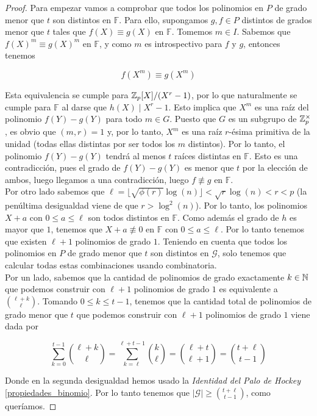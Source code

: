 \begin{proof}
	Para empezar vamos a comprobar que todos los polinomios en $P$ de grado menor que $t$ son distintos en $\mathbb{F}$. Para ello, supongamos $g, f \in P$ distintos de grados menor que $t$ tales que $f(X) \equiv g(X)$ en $\mathbb{F}$. Tomemos $m \in I$. Sabemos que $f(X)^m \equiv g(X)^m$ en $\mathbb{F}$, y como $m$ es introspectivo para $f$ y $g$, entonces tenemos
	
	\[ f(X^m) \equiv g(X^m) \]
	
	Esta equivalencia se cumple para $\mathbb{Z}_p[X]/(X^r - 1)$, por lo que naturalmente se cumple para $\mathbb{F}$ al darse que $h(X) \mid X^r - 1$. Esto implica que $X^m$ es una raíz del polinomio $f(Y) - g(Y)$ para todo $m \in G$. Puesto que $G$ es un subgrupo de $\mathbb{Z}_p^\times$, es obvio que $(m, r) = 1$ y, por lo tanto, $X^m$ es una raíz $r$-ésima primitiva de la unidad (todas ellas distintas por ser todos los $m$ distintos). Por lo tanto, el polinomio $f(Y) - g(Y)$ tendrá al menos $t$ raíces distintas en $\mathbb{F}$. Esto es una contradicción, pues el grado de $f(Y) - g(Y)$ es menor que $t$ por la elección de ambos, luego llegamos a una contradicción, luego $f \not\equiv g$ en $\mathbb{F}$.\\
	
	Por otro lado sabemos que $\ell = \lfloor \sqrt{\phi(r)}\log(n) \rfloor < \sqrt{r}\log(n) < r < p$ (la penúltima desigualdad viene de que $r > \log^2(n)$). Por lo tanto, los polinomios $X + a$ con $0 \leq a \leq \ell$ son todos distintos en $\mathbb{F}$. Como además el grado de $h$ es mayor que $1$, tenemos que $X + a \not\equiv 0$ en $\mathbb{F}$ con $0 \leq a \leq \ell$. Por lo tanto tenemos que existen $\ell + 1$ polinomios de grado $1$. Teniendo en cuenta que todos los polinomios en $P$ de grado menor que $t$ son distintos en $\mathcal{G}$, solo tenemos que calcular todas estas combinaciones usando combinatoria.\\
	
	Por un lado, sabemos que la cantidad de polinomios de grado exactamente $k \in \mathbb{N}$ que podemos construir con $\ell + 1$ polinomios de grado $1$ es equivalente a $\binom{\ell+k}{\ell}$. Tomando $0 \leq k \leq t-1$, tenemos que la cantidad total de polinomios de grado menor que $t$ que podemos construir con $\ell + 1$ polinomios de grado $1$ viene dada por
	
	\[ \sum_{k=0}^{t-1}\binom{\ell+k}{\ell} = \sum_{k=\ell}^{\ell+t-1}\binom{k}{\ell} = \binom{\ell + t}{\ell + 1} = \binom{t + \ell}{t - 1} \]
	
	Donde en la segunda desigualdad hemos usado la \textit{Identidad del Palo de Hockey} \ref{propiedades_binomio}. Por lo tanto tenemos que $|\mathcal{G}| \geq \binom{t + \ell}{t - 1}$, como queríamos.
\end{proof}

